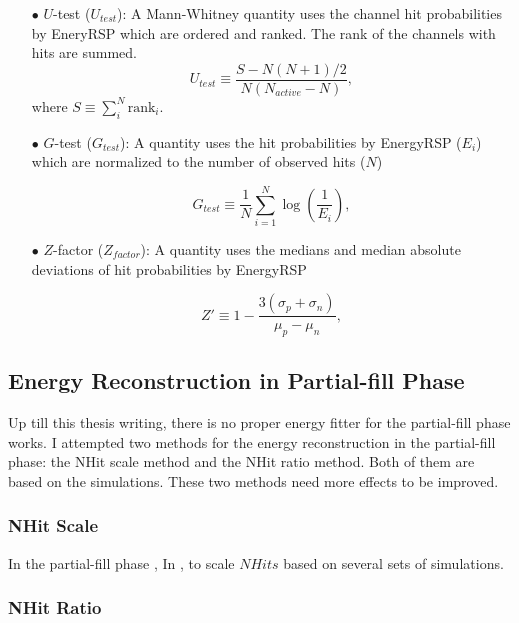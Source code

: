 \begin{itemize}
	
	\item[$\bullet$]$U$-test ($U_{test}$):
	A Mann-Whitney quantity uses the channel hit probabilities by EneryRSP which are ordered and ranked. The rank of the channels with hits are summed.%
		\begin{equation}
		U_{test}\equiv \frac{S-N(N+1)/2}{N(N_{active}-N)},
		\end{equation}
	where $S\equiv \sum_{i}^N \mathrm{rank}_i$. 
	
	\item[$\bullet$] $G$-test ($G_{test}$):
	A quantity uses the hit probabilities by EnergyRSP ($E_i$) which are normalized to the number of observed hits ($N$) %
	
	\begin{equation}
	G_{test}\equiv \frac{1}{N}\sum_{i=1}^N \log(\frac{1}{E_i}),
	\end{equation}
	
	\item[$\bullet$] $Z$-factor ($Z_{factor}$):
	A quantity uses the medians and median absolute deviations
of hit probabilities by EnergyRSP
	
	\begin{equation}
     Z'\equiv 1-\frac{3(\sigma_p+\sigma_n)}{\mu_p-\mu_n},
    \end{equation}
\end{itemize}

\subsection{Energy Reconstruction in Partial-fill Phase}
Up till this thesis writing, there is no proper energy fitter for the partial-fill phase works. I attempted two methods for the energy reconstruction in the partial-fill phase: the NHit scale method and the NHit ratio method. Both of them are based on the simulations. These two methods need more effects to be improved.
\subsubsection{NHit Scale}
In the partial-fill phase ,  In \cite{partialEnergy}, 
to scale $NHits$ based on several sets of simulations.

\subsubsection{NHit Ratio}


